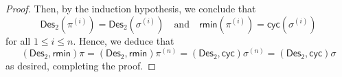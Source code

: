 \documentclass[10pt,a4paper]{amsart}
\def\Des{\mathsf{Des}}
\def\cyc{\mathsf{cyc}}
\def\rmin{\mathsf{rmin}}
\begin{document}
\begin{proof}
     Then, by the induction hypothesis, we conclude that
     \[
     \Des_2(\pi^{(i)})=\Des_2(\sigma^{(i)})\quad \mbox{and}\quad \rmin(\pi^{(i)})=\cyc(\sigma^{(i)})
     \]
     for all $1\leq i\leq n$. Hence, we deduce that
     \[
     (\Des_2, \rmin)\pi=  (\Des_2, \rmin)\pi^{(n)}= (\Des_2, \cyc)\sigma^{(n)}=(\Des_2, \cyc)\sigma
     \]
     as desired, completing the proof. 
     	\end{proof}
\end{document}
